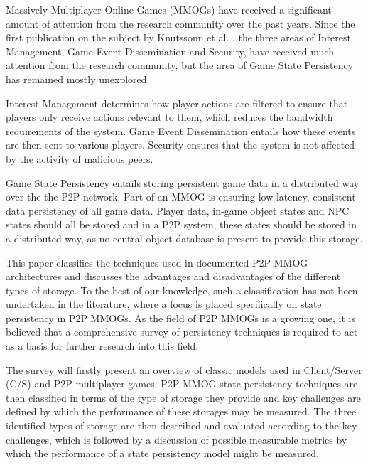 \documentclass[10pt,a4paper,journal,cspaper,compsoc]{IEEEtran}
\begin{document}
%
%
%
%
 Massively Multiplayer Online Games (MMOGs) have received a significant amount of attention from the research
community over the past years. Since the first publication on the subject by Knutssonn et al. \cite{knutsson_p2p_first}, the three areas of Interest
Management, Game Event Dissemination and Security, have received much attention from the research community, but the area of Game State Persistency
has remained mostly unexplored.

Interest Management determines how player actions are filtered to ensure that players only receive actions relevant to them, which reduces the
bandwidth requirements of the system. Game Event Dissemination entails how these events are then sent to various players. Security ensures that the
system is not affected by the activity of malicious peers.

Game State Persistency entails storing persistent game data in a distributed way over the the P2P network. Part of an MMOG is ensuring low latency,
consistent data persistency of all game data. Player data, in-game object states and NPC states should all be stored and in a P2P system, these
states should be stored in a distributed way, as no central object database is present to provide this storage.

This paper classifies the techniques used in documented P2P MMOG architectures and discusses the advantages and disadvantages of the different types
of storage. To the best of our knowledge, such a classification has not been undertaken in the literature, where a focus is placed specifically on
state persistency in P2P MMOGs. As the field of P2P MMOGs is a growing one, it is believed that a comprehensive survey of persistency techniques is
required to act as a basis for further research into this field.

The survey will firstly present an overview of classic models used in Client/Server (C/S) and P2P multiplayer games. P2P MMOG state persistency
techniques are then classified in terms of the type of storage they provide and key challenges are defined by which the performance of these storages
may be measured. The three identified types of storage are then described and evaluated according to the key challenges, which is followed by a
discussion of possible measurable metrics by which the performance of a state persistency model might be measured.
\end{document}
